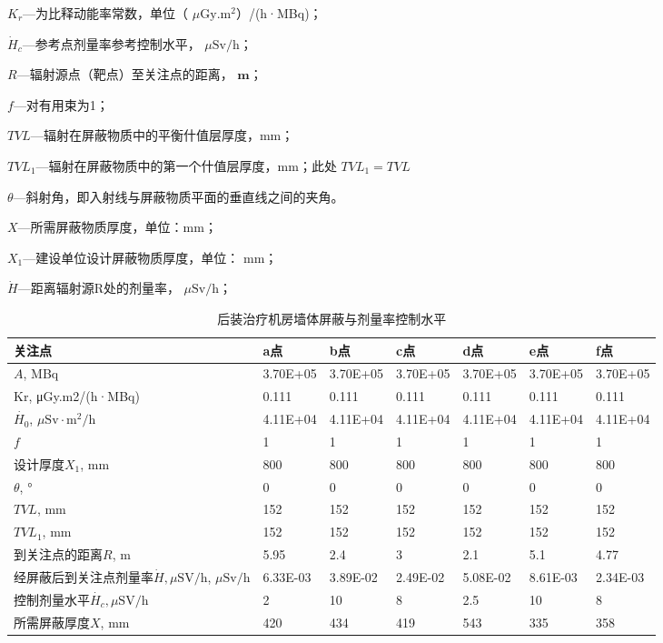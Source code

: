 $K _ { r }$—为比释动能率常数，单位（ $\mu \mathrm { G y } . \mathrm { m } ^ { 2 }$）/(h·MBq)；

$\dot { H } _ { c }$—参考点剂量率参考控制水平， $\mu \mathrm { S v / h }$；

$R$—辐射源点（靶点）至关注点的距离， $\mathbf { m }$；

$f$—对有用束为1；

$TVL$—辐射在屏蔽物质中的平衡什值层厚度，mm；

$TVL_1$—辐射在屏蔽物质中的第一个什值层厚度，mm；此处 $T V L _ {1}  = T V L$

$\theta$—斜射角，即入射线与屏蔽物质平面的垂直线之间的夹角。

$X$—所需屏蔽物质厚度，单位：mm；

$X _ { 1 }$—建设单位设计屏蔽物质厚度，单位： $\mathrm { m m }$；

$\dot { H }$—距离辐射源R处的剂量率， $\mu \mathrm { S v / h }$；


\begin{table}[H]
\centering
\caption{后装治疗机房墙体屏蔽与剂量率控制水平}
\label{tab:ch4-wall-dose}
\begin{tabular}{|m{4cm}|m{1.6cm}|m{1.6cm}|m{1.6cm}|m{1.6cm}|m{1.6cm}|m{1.6cm}|}
\hline
关注点 & a点 & b点 & c点 & d点 & e点 & f点 \\
\hline
$A$, MBq & 3.70E+05 & 3.70E+05 & 3.70E+05 & 3.70E+05 & 3.70E+05 & 3.70E+05 \\
\hline
Kr, μGy.m2/(h·MBq) & 0.111 & 0.111 & 0.111 & 0.111 & 0.111 & 0.111 \\
\hline
$\dot{H_0}$, $\mu\mathrm{Sv\cdot m^2/h}$ & 4.11E+04 & 4.11E+04 & 4.11E+04 & 4.11E+04 & 4.11E+04 & 4.11E+04 \\
\hline
$f$ & 1 & 1 & 1 & 1 & 1 & 1 \\
\hline
设计厚度$X_1$, mm & 800 & 800 & 800 & 800 & 800 & 800 \\
\hline
$\theta$, ° & 0 & 0 & 0 & 0 & 0 & 0 \\
\hline
$TVL$, mm & 152 & 152 & 152 & 152 & 152 & 152 \\
\hline
$TVL_1$, mm & 152 & 152 & 152 & 152 & 152 & 152 \\
\hline
到关注点的距离$R$, m & 5.95 & 2.4 & 3 & 2.1 & 5.1 & 4.77 \\
\hline
经屏蔽后到关注点剂量率$\dot{H},\mu\mathrm{SV/h}$, $\mu\mathrm{Sv/h}$ & 6.33E-03 & 3.89E-02 & 2.49E-02 & 5.08E-02 & 8.61E-03 & 2.34E-03 \\
\hline
控制剂量水平$\dot{H_c},\mu\mathrm{SV/h}$ & 2 & 10 & 8 & 2.5 & 10 & 8 \\
\hline
所需屏蔽厚度$X$, mm & 420 & 434 & 419 & 543 & 335 & 358 \\
\hline
\end{tabular}
\end{table}


